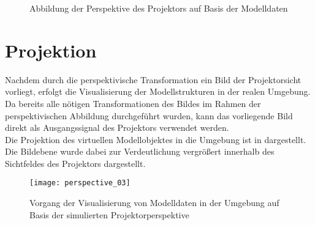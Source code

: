 \begin{figure}[!ht]
	\begin{center}
	\hspace{5mm}
	\caption{Abbildung der Perspektive des Projektors auf Basis der Modelldaten}
	\label{fig.projpersp_gui}
	\end{center}
\end{figure}%
%
%
%
%
\section{Projektion}
\label{chap.projection}
Nachdem durch die perspektivische Transformation ein Bild der Projektorsicht vorliegt, erfolgt die Visualisierung der Modellstrukturen in der realen Umgebung. Da bereits alle nötigen Transformationen des Bildes im Rahmen der perspektivischen Abbildung durchgeführt wurden, kann das vorliegende Bild direkt als Ausgangssignal des Projektors verwendet werden.\\
Die Projektion des virtuellen Modellobjektes in die Umgebung ist in  dargestellt. 
Die Bildebene wurde dabei zur Verdeutlichung vergrößert innerhalb des Sichtfeldes des Projektors dargestellt. 

\begin{figure}[!ht]
	\begin{center}
		\texttt{[image: perspective\_03]}
		\caption{Vorgang der Visualisierung von Modelldaten in der Umgebung auf Basis der simulierten Projektorperspektive}
		\label{fig.perspproj}
	\end{center}
\end{figure}

